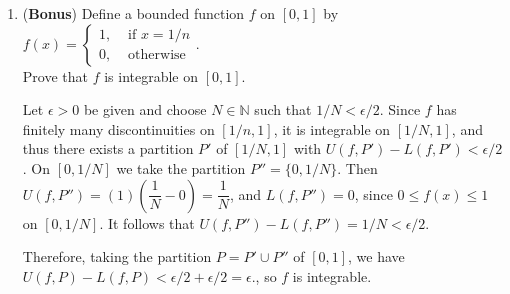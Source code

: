 \documentclass[letterpaper,12pt]{article}
\newcommand{\N}{\mathbb{N}}
\begin{document}
\begin{enumerate}
\item ({\bf Bonus}) Define a bounded function $f$ on $[0,1]$ by $\displaystyle f(x)=\begin{cases} 1, & \text{ if } x=1/n\\ 0, & \text{ otherwise}\end{cases}$. \\Prove that $f$ is integrable on $[0,1]$.

\bigskip

Let $\epsilon>0$ be given and choose $N\in\N$ such that $1/N<\epsilon/2$. Since $f$ has finitely many discontinuities on $[1/n,1]$, it is integrable on $[1/N,1]$, and thus there exists a partition $P'$ of $[1/N,1]$ with $U(f,P')-L(f,P')<\epsilon/2$. On $[0,1/N]$ we take the partition $P'' = \{0,1/N\}$. Then $U(f,P'') = (1)\left(\dfrac{1}{N}-0\right) = \dfrac{1}{N}$, and $L(f,P'') = 0$, since $0\leq f(x)\leq 1$ on $[0,1/N]$. It follows that $U(f,P'')-L(f,P'')= 1/N<\epsilon/2$.

Therefore, taking the partition $P=P'\cup P''$ of $[0,1]$, we have $U(f,P)-L(f,P)<\epsilon/2+\epsilon/2=\epsilon.$, so $f$ is integrable.

\bigskip



\end{enumerate}
\end{document}
